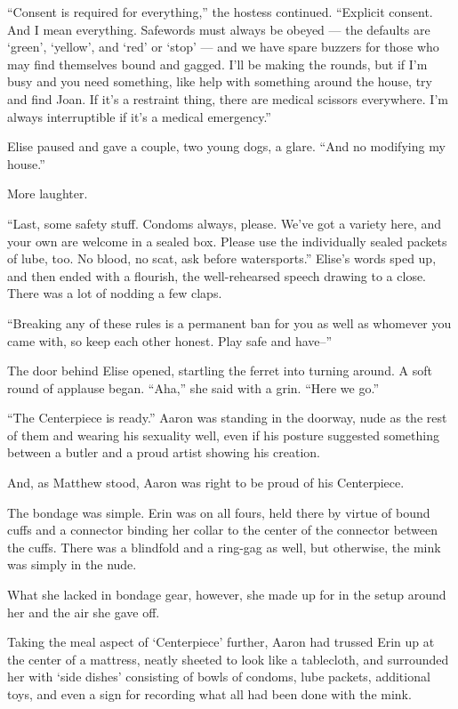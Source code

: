 ``Consent is required for everything,'' the hostess continued. ``Explicit consent. And I mean everything. Safewords must always be obeyed --- the defaults are `green', `yellow', and `red' or `stop' --- and we have spare buzzers for those who may find themselves bound and gagged. I'll be making the rounds, but if I'm busy and you need something, like help with something around the house, try and find Joan. If it's a restraint thing, there are medical scissors everywhere. I'm always interruptible if it's a medical emergency.''

Elise paused and gave a couple, two young dogs, a glare. ``And no modifying my house.''

More laughter.

``Last, some safety stuff. Condoms always, please. We've got a variety here, and your own are welcome in a sealed box. Please use the individually sealed packets of lube, too. No blood, no scat, ask before watersports.'' Elise's words sped up, and then ended with a flourish, the well-rehearsed speech drawing to a close. There was a lot of nodding a few claps.

``Breaking any of these rules is a permanent ban for you as well as whomever you came with, so keep each other honest. Play safe and have--''

The door behind Elise opened, startling the ferret into turning around. A soft round of applause began. ``Aha,'' she said with a grin. ``Here we go.''

``The Centerpiece is ready.'' Aaron was standing in the doorway, nude as the rest of them and wearing his sexuality well, even if his posture suggested something between a butler and a proud artist showing his creation.

And, as Matthew stood, Aaron was right to be proud of his Centerpiece.

The bondage was simple. Erin was on all fours, held there by virtue of bound cuffs and a connector binding her collar to the center of the connector between the cuffs. There was a blindfold and a ring-gag as well, but otherwise, the mink was simply in the nude.

What she lacked in bondage gear, however, she made up for in the setup around her and the air she gave off.

Taking the meal aspect of `Centerpiece' further, Aaron had trussed Erin up at the center of a mattress, neatly sheeted to look like a tablecloth, and surrounded her with `side dishes' consisting of bowls of condoms, lube packets, additional toys, and even a sign for recording what all had been done with the mink.

